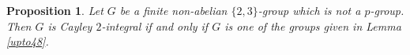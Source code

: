 \documentclass{amsart}
\newtheorem{pro}[thm]{Proposition}
\begin{document}
\begin{pro}\label{2,3}
	Let $G$ be a finite non-abelian $\{2,3\}$-group which is not a $p$-group. Then $G$ is Cayley $2$-integral if and only if $G$ is one of the groups given in Lemma \ref{upto48}.
\end{pro}
\end{document}
